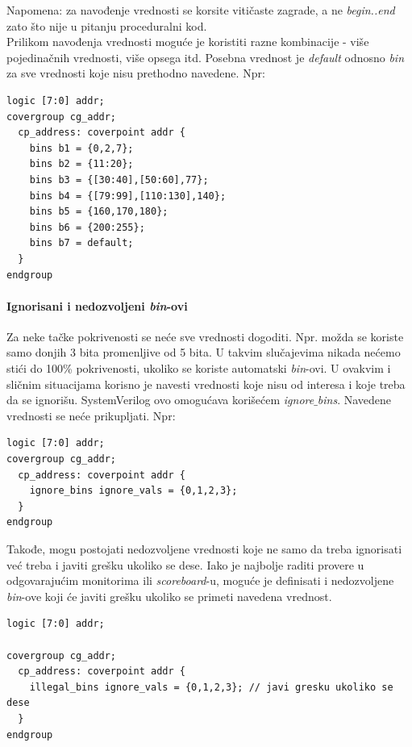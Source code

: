 Napomena: za navođenje vrednosti se korsite vitičaste zagrade, a ne
\emph{begin..end} zato što nije u pitanju proceduralni kod.\\

Prilikom navođenja vrednosti moguće je koristiti razne kombinacije - više
pojedinačnih vrednosti, više opsega itd. Posebna vrednost je \emph{default}
odnosno \emph{bin} za sve vrednosti koje nisu prethodno navedene. Npr:

\begin{lstlisting}
logic [7:0] addr;
covergroup cg_addr;
  cp_address: coverpoint addr {
    bins b1 = {0,2,7};
    bins b2 = {11:20};
    bins b3 = {[30:40],[50:60],77};
    bins b4 = {[79:99],[110:130],140};
    bins b5 = {160,170,180};
    bins b6 = {200:255};
    bins b7 = default;
  }
endgroup
\end{lstlisting}

\paragraph{Ignorisani i nedozvoljeni \emph{bin}-ovi}

Za neke tačke pokrivenosti se neće sve vrednosti dogoditi. Npr. možda se koriste
samo donjih 3 bita promenljive od 5 bita. U takvim slučajevima nikada nećemo
stići do 100\% pokrivenosti, ukoliko se koriste automatski \emph{bin}-ovi. U
ovakvim i sličnim situacijama korisno je navesti vrednosti koje nisu od interesa
i koje treba da se ignorišu. SystemVerilog ovo omogućava korišećem
\emph{ignore\(\_\)bins}. Navedene vrednosti se neće prikupljati. Npr:

\begin{lstlisting}
logic [7:0] addr;
covergroup cg_addr;
  cp_address: coverpoint addr {
    ignore_bins ignore_vals = {0,1,2,3};
  }
endgroup
\end{lstlisting}

Takođe, mogu postojati nedozvoljene vrednosti koje ne samo da treba ignorisati
već treba i javiti grešku ukoliko se dese. Iako je najbolje raditi provere u
odgovarajućim monitorima ili \emph{scoreboard}-u, moguće je definisati i
nedozvoljene \emph{bin}-ove koji će javiti grešku ukoliko se primeti navedena
vrednost.

\begin{lstlisting}
logic [7:0] addr;

covergroup cg_addr;
  cp_address: coverpoint addr {
    illegal_bins ignore_vals = {0,1,2,3}; // javi gresku ukoliko se dese
  }
endgroup
\end{lstlisting}


